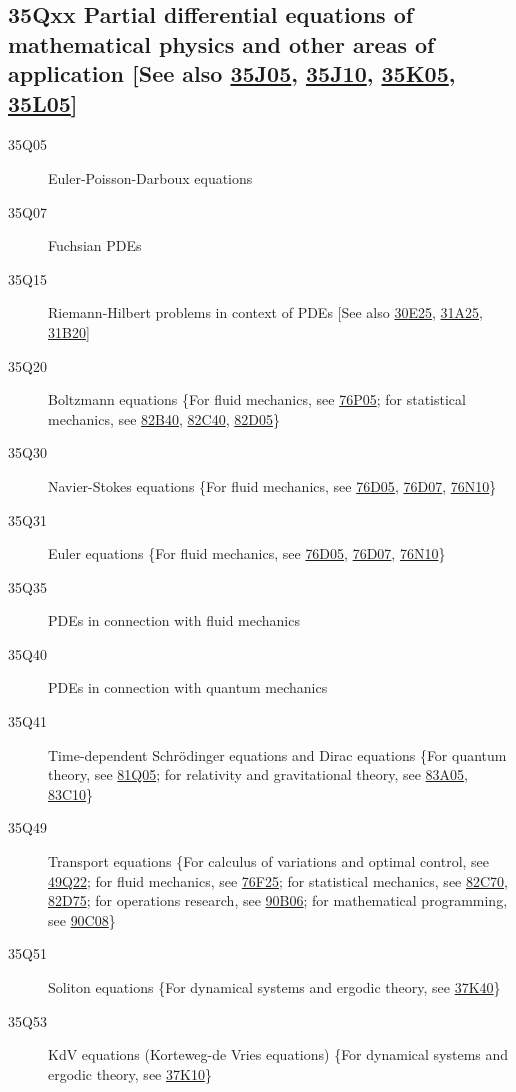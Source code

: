 \documentclass[letterpaper]{article}
\begin{document}
\subsection*{35Qxx  Partial differential equations of mathematical physics and other areas of application [See also \hyperref[35J05]{35J05}, \hyperref[35J10]{35J10}, \hyperref[35K05]{35K05}, \hyperref[35L05]{35L05}] }\label{35Qxx}
\begin{description}  
\item [35Q05]\label{35Q05} Euler-Poisson-Darboux equations 
\item [35Q07]\label{35Q07} Fuchsian PDEs
\item [35Q15]\label{35Q15} Riemann-Hilbert problems in context of PDEs  [See also \hyperref[30E25]{30E25}, \hyperref[31A25]{31A25}, \hyperref[31B20]{31B20}]
\item [35Q20]\label{35Q20} Boltzmann equations \{For fluid mechanics, see \hyperref[76P05]{76P05}; for statistical mechanics, see \hyperref[82B40]{82B40}, \hyperref[82C40]{82C40}, \hyperref[82D05]{82D05}\}
\item [35Q30]\label{35Q30} Navier-Stokes equations \{For fluid mechanics, see \hyperref[76D05]{76D05}, \hyperref[76D07]{76D07}, \hyperref[76N10]{76N10}\}
\item [35Q31]\label{35Q31} Euler equations \{For fluid mechanics, see \hyperref[76D05]{76D05}, \hyperref[76D07]{76D07}, \hyperref[76N10]{76N10}\}
\item [35Q35]\label{35Q35} PDEs in connection with fluid mechanics
\item [35Q40]\label{35Q40} PDEs in connection with quantum mechanics
\item [35Q41]\label{35Q41} Time-dependent Schr\"{o}dinger equations and  Dirac equations \{For quantum theory, see \hyperref[81Q05]{81Q05}; for relativity and gravitational theory, see \hyperref[83A05]{83A05}, \hyperref[83C10]{83C10}\}
\item [35Q49]\label{35Q49} Transport equations \{For calculus of variations and optimal control, see \hyperref[49Q22]{49Q22}; for fluid mechanics, see \hyperref[76F25]{76F25}; for statistical mechanics, see \hyperref[82C70]{82C70}, \hyperref[82D75]{82D75}; for operations research, see \hyperref[90B06]{90B06}; for mathematical programming, see \hyperref[90C08]{90C08}\}
\item [35Q51]\label{35Q51} Soliton equations \{For dynamical systems and ergodic theory, see \hyperref[37K40]{37K40}\}
\item [35Q53]\label{35Q53} KdV equations (Korteweg-de Vries equations) \{For dynamical systems and ergodic theory, see \hyperref[37K10]{37K10}\}

\end{description}
\end{document}
